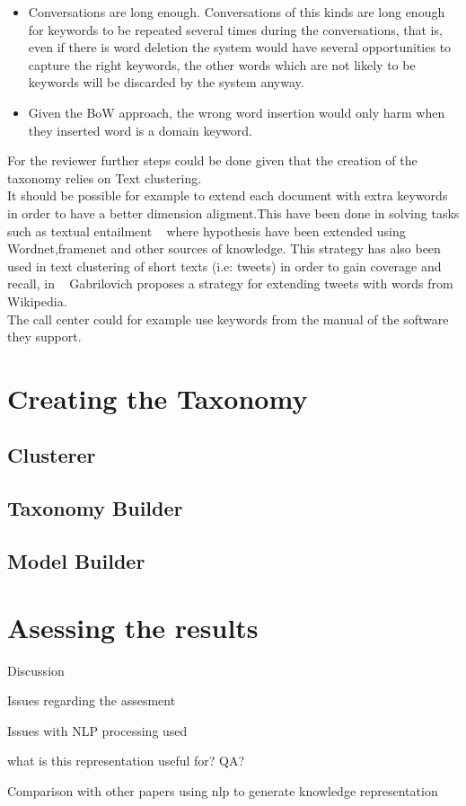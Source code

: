 \documentclass[4pt,a4paper,twocolumn]{article}
\begin{document}
\begin{itemize}
	\item Conversations are long enough. Conversations of this kinds are long enough for keywords to be repeated several times during the conversations, that is, even if there is word deletion the system would have several opportunities to capture the right keywords, the other words which are not likely to be keywords will be discarded by the system anyway.

  \item Given the BoW approach, the wrong word insertion would only harm when they inserted word is a domain keyword.
  
\end{itemize}

For the reviewer further steps could be done given that the creation of the taxonomy relies on Text clustering.\\
It should be possible for example to extend each document with extra keywords in order to have a better dimension aligment.This have been done in solving tasks such as  textual entailment ~\cite{Mirkin:2009:EIU:1609067.1609129} where hypothesis have been extended using Wordnet,framenet and other sources of knowledge. This strategy has also been used in text clustering of short texts (i.e: tweets)  in order to gain coverage and recall, in ~\cite{Gabrilovich:2006:OBB:1597348.1597395} Gabrilovich proposes a strategy for extending tweets with words from Wikipedia.\\
The call center could for example use keywords from the manual of the software they support.


	\section{Creating the Taxonomy}
		\subsection{Clusterer}
		\subsection{Taxonomy Builder}
		\subsection{Model Builder}


	\section{Asessing the results}

	

Discussion

Issues regarding the assesment

Issues with NLP processing used

what is this representation useful for? QA?

Comparison with other papers using nlp to generate knowledge representation







{}

\end{document}
